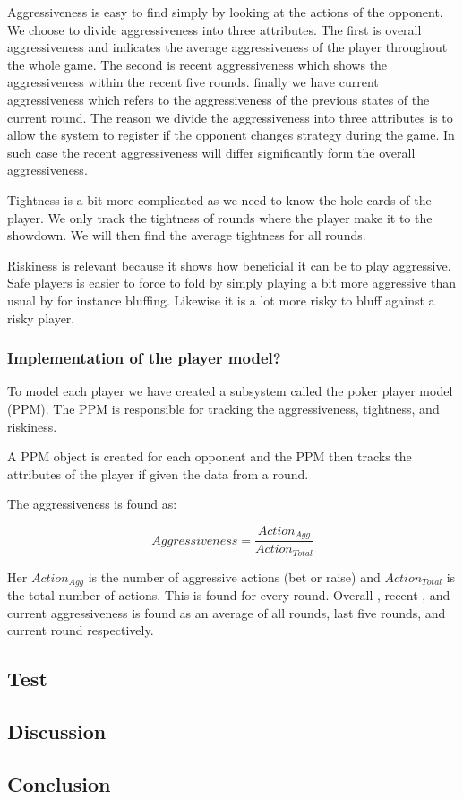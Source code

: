 Aggressiveness is easy to find simply by looking at the actions of the opponent. We choose to divide aggressiveness into three attributes. The first is overall aggressiveness and indicates the average aggressiveness of the player throughout the whole game. The second is recent aggressiveness which shows the aggressiveness within the recent five rounds. finally we have current aggressiveness which refers to the aggressiveness of the previous states of the current round. 
The reason we divide the aggressiveness into three attributes is to allow the system to register if the opponent changes strategy during the game. In such case the recent aggressiveness will differ significantly form the overall aggressiveness. 

Tightness is a bit more complicated as we need to know the hole cards of the player. We only track the tightness of rounds where the player make it to the showdown. We will then find the average tightness for all rounds.

Riskiness is relevant because it shows how beneficial it can be to play aggressive. Safe players is easier to force to fold by simply playing a bit more aggressive than usual by for instance bluffing. Likewise it is a lot more risky to bluff against a risky player.

\subsubsection{Implementation of the player model?}
To model each player we have created a subsystem called the poker player model (PPM). The PPM is responsible for tracking the aggressiveness, tightness, and riskiness.

A PPM object is created for each opponent and the PPM then tracks the attributes of the player if given the data from a round.

The aggressiveness is found as:

\[Aggressiveness = \frac{Action_{Agg}}{Action_{Total}}\]

Her $Action_{Agg}$ is the number of aggressive actions (bet or raise) and  $Action_{Total}$ is the total number of actions. This is found for every round. Overall-, recent-, and current aggressiveness is found as an average of all rounds, last five rounds, and current round respectively.





\subsection{Test}


\subsection{Discussion}

\subsection{Conclusion}
